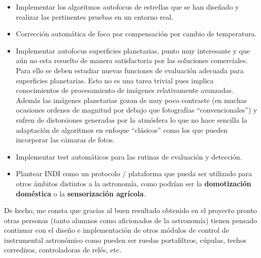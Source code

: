 \begin{itemize}
	\item Implementar los algoritmos autofocus de estrellas que se han diseñado y realizar las pertinentes pruebas en un entorno real.
	\item Corrección automática de foco por compensación por cambio de temperatura.
	\item Implementar autofocus superficies planetarias, punto muy interesante y que aún no esta resuelto de manera satisfactoria por las soluciones comerciales. Para ello se deben estudiar nuevas funciones de evaluación adecuada para superficies planetarias. Esto no es una tarea trivial pues implica conocimientos de procesamiento de imágenes relativamente avanzadas. Además las imágenes planetarias gozan de muy poco contraste (en muchas ocasiones ordenes de magnitud por debajo que fotografías ``convencionales'') y sufren de distorsiones generadas por la atmósfera lo que no hace sencilla la adaptación de algoritmos en enfoque ``clásicos'' como los que pueden incorporar las cámaras de fotos. 
	\item Implementar test automáticos para las rutinas de evaluación y detección.
	\item Plantear INDI como un protocolo / plataforma que pueda ser utilizado para otros ámbitos distintos a la astronomía, como podrían ser la \textbf{domotización doméstica} o la \textbf{sensorización agrícola}.
\end{itemize}

De hecho, me consta que gracias al buen resultado obtenido en el proyecto pronto otras personas (tanto alumnos como aficionados de la astronomía) tienen pensado continuar con el diseño e implementación de otros módulos de control de instrumental astronómico como pueden ser ruedas portafiltros, cúpulas, techos corredizos, controladoras de relés, etc.




